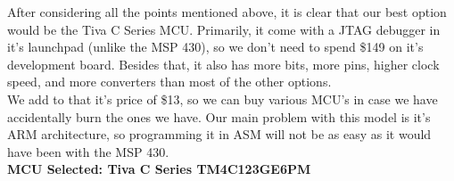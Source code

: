 After considering all the points mentioned above, it is clear that our best option would be the Tiva C Series MCU. Primarily, it come with a JTAG debugger in it's launchpad (unlike the MSP 430), so we don't need to spend \$149 on it's development board. Besides that, it also has more bits, more pins, higher clock speed, and more converters than most of the other options. \\

We add to that it's price of \$13, so we can buy various MCU's in case we have accidentally burn the ones we have. Our main problem with this model is it's ARM architecture, so programming it in ASM will not be as easy as it would have been with the MSP 430. \\

\textbf{MCU Selected: Tiva C Series TM4C123GE6PM}







